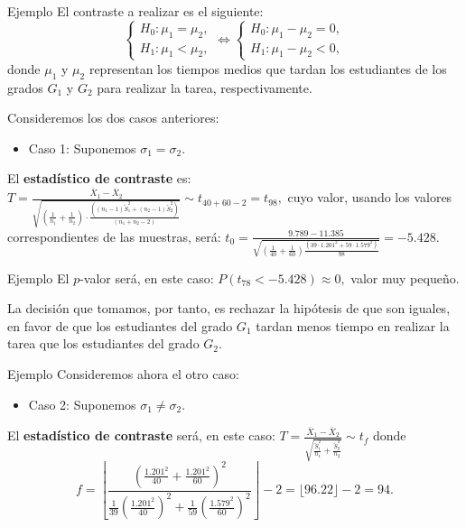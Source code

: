 \documentclass[
  ignorenonframetext,
]{beamer}
\providecommand{\tightlist}{%
  \setlength{\itemsep}{0pt}\setlength{\parskip}{0pt}}
\begin{document}
\begin{frame}{Ejemplo}
\protect\hypertarget{ejemplo-26}{}
El contraste a realizar es el siguiente: \[
\left\{\begin{array}{l}
H_0:\mu_1=\mu_2,\\
H_1:\mu_1< \mu_2,
\end{array}\right.
\Longleftrightarrow
\left\{\begin{array}{l}
H_0:\mu_1-\mu_2=0,\\
H_1:\mu_1- \mu_2<0,
\end{array}\right.
\] donde \(\mu_1\) y \(\mu_2\) representan los tiempos medios que tardan
los estudiantes de los grados \(G_1\) y \(G_2\) para realizar la tarea,
respectivamente.

Consideremos los dos casos anteriores:

\begin{itemize}[<+->]
\tightlist
\item
  Caso 1: Suponemos \(\sigma_1=\sigma_2\).
\end{itemize}

El \textbf{estadístico de contraste} es:
\(T=\frac{\overline{X}_1-\overline{X}_2} {\sqrt{(\frac1{n_1}+\frac1{n_2})\cdot \frac{((n_1-1)\widetilde{S}_1^2+(n_2-1)\widetilde{S}_2^2)} {(n_1+n_2-2)}}}\sim t_{40+60-2}=t_{98},\)
cuyo valor, usando los valores correspondientes de las muestras, será:
\(t_0=\frac{9.789-11.385}{\sqrt{(\frac1{40}+\frac1{60})\frac{(39\cdot 1.201^2+59\cdot 1.579^2)}{98}}}=-5.428.\)
\end{frame}

\begin{frame}{Ejemplo}
\protect\hypertarget{ejemplo-27}{}
El \(p\)-valor será, en este caso: \(P(t_{78}<-5.428)\approx 0,\) valor
muy pequeño.

La decisión que tomamos, por tanto, es rechazar la hipótesis de que son
iguales, en favor de que los estudiantes del grado \(G_1\) tardan menos
tiempo en realizar la tarea que los estudiantes del grado \(G_2\).
\end{frame}

\begin{frame}{Ejemplo}
\protect\hypertarget{ejemplo-28}{}
Consideremos ahora el otro caso:

\begin{itemize}[<+->]
\tightlist
\item
  Caso 2: Suponemos \(\sigma_1\neq \sigma_2\).
\end{itemize}

El \textbf{estadístico de contraste} será, en este caso:
\(T=\frac{\overline{X}_1-\overline{X}_2}{\sqrt{\frac{\widetilde{S}_1^2}{n_1}+\frac{\widetilde{S}_2^2}{n_2}}}\sim t_f\)
donde \[
f=\left\lfloor\frac{ \left( \frac{1.201^2}{40}+\frac{1.201^2}{60}\right)^2}
{\frac1{39}\left(\frac{1.201^2}{40}\right)^2+\frac1{59}\left(\frac{1.579^2}{60}\right)^2}\right\rfloor -2
=\lfloor 96.22\rfloor-2=94.
\]
\end{frame}
\end{document}
